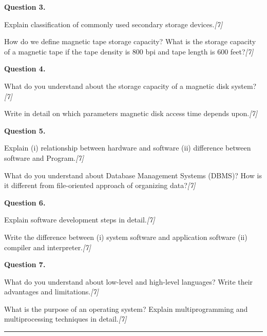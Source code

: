 \documentclass[11pt,a4paper]{article}
\newcommand{\pts}[1]{\hfill \textit{[#1]}}
\begin{document}
\bigskip

\noindent \textbf{Question 3.}

\begin{parts}
  \item Explain classification of commonly used secondary storage devices.\pts{7}
  \item How do we define magnetic tape storage capacity? What is the storage capacity of a magnetic tape if the tape density is 800 bpi and tape length is 600 feet?\pts{7}
\end{parts}

\bigskip

\noindent \textbf{Question 4.}

\begin{parts}
  \item What do you understand about the storage capacity of a magnetic disk system?\pts{7}
  \item Write in detail on which parameters magnetic disk access time depends upon.\pts{7}
\end{parts}

\bigskip

\noindent \textbf{Question 5.}

\begin{parts}
  \item Explain (i) relationship between hardware and software (ii) difference between software and Program.\pts{7}
  \item What do you understand about Database Management Systems (DBMS)? How is it different from file-oriented approach of organizing data?\pts{7}
\end{parts}

\bigskip

\noindent \textbf{Question 6.}

\begin{parts}
  \item Explain software development steps in detail.\pts{7}
  \item Write the difference between (i) system software and application software (ii) compiler and interpreter.\pts{7}
\end{parts}

\bigskip

\noindent \textbf{Question 7.}

\begin{parts}
  \item What do you understand about low-level and high-level languages? Write their advantages and limitations.\pts{7}
  \item What is the purpose of an operating system? Explain multiprogramming and multiprocessing techniques in detail.\pts{7}
\end{parts}

\vfill\rule{\linewidth}{0.4pt}
\end{document}

